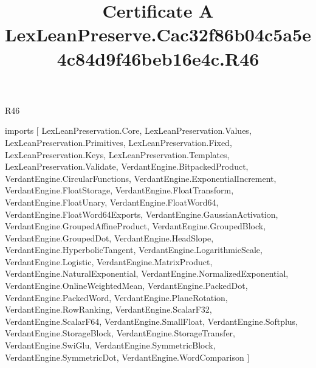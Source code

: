 \begin{lexlean}{R46}
\title{Certificate A LexLeanPreserve.Cac32f86b04c5a5e4c84d9f46beb16e4c.R46}
\begin{coremodule}
imports [
  LexLeanPreservation.Core,
  LexLeanPreservation.Values,
  LexLeanPreservation.Primitives,
  LexLeanPreservation.Fixed,
  LexLeanPreservation.Keys,
  LexLeanPreservation.Templates,
  LexLeanPreservation.Validate,
  VerdantEngine.BitpackedProduct,
  VerdantEngine.CircularFunctions,
  VerdantEngine.ExponentialIncrement,
  VerdantEngine.FloatStorage,
  VerdantEngine.FloatTransform,
  VerdantEngine.FloatUnary,
  VerdantEngine.FloatWord64,
  VerdantEngine.FloatWord64Exports,
  VerdantEngine.GaussianActivation,
  VerdantEngine.GroupedAffineProduct,
  VerdantEngine.GroupedBlock,
  VerdantEngine.GroupedDot,
  VerdantEngine.HeadSlope,
  VerdantEngine.HyperbolicTangent,
  VerdantEngine.LogarithmicScale,
  VerdantEngine.Logistic,
  VerdantEngine.MatrixProduct,
  VerdantEngine.NaturalExponential,
  VerdantEngine.NormalizedExponential,
  VerdantEngine.OnlineWeightedMean,
  VerdantEngine.PackedDot,
  VerdantEngine.PackedWord,
  VerdantEngine.PlaneRotation,
  VerdantEngine.RowRanking,
  VerdantEngine.ScalarF32,
  VerdantEngine.ScalarF64,
  VerdantEngine.SmallFloat,
  VerdantEngine.Softplus,
  VerdantEngine.StorageBlock,
  VerdantEngine.StorageTransfer,
  VerdantEngine.SwiGlu,
  VerdantEngine.SymmetricBlock,
  VerdantEngine.SymmetricDot,
  VerdantEngine.WordComparison
]


\end{coremodule}
\end{lexlean}
